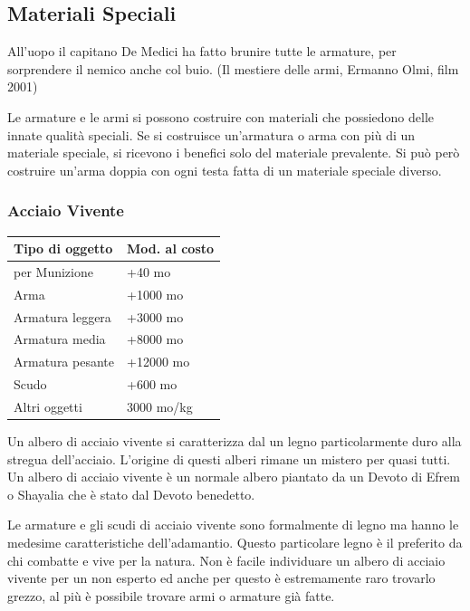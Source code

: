 \pagebreak

\subsection{Materiali Speciali}

\begin{enfasi}{
All'uopo il capitano De Medici ha fatto brunire tutte le armature, per sorprendere il nemico anche col buio. (Il mestiere delle armi, Ermanno Olmi, film 2001)}\end{enfasi}

\begin{multicols}{2}

Le armature e le armi si possono costruire con materiali che possiedono delle innate qualità speciali. Se si costruisce un'armatura o arma con più di un materiale speciale, si ricevono i benefici solo del materiale prevalente. Si può però costruire un'arma doppia con ogni testa fatta di un materiale speciale diverso.

\subsubsection{Acciaio Vivente}

\label{acciaio-vivente}

\noindent\begin{tabularx}{\linewidth}{Xl}
	\toprule
\rowcolor{gray!20}\textbf{Tipo di oggetto} & \textbf{Mod. al costo}\\
\toprule
per Munizione & +40 mo \\
\rowcolor{gray!20}Arma & +1000 mo\\
Armatura leggera & +3000 mo\\
\rowcolor{gray!20}Armatura media & +8000 mo\\
Armatura pesante & +12000 mo\\
\rowcolor{gray!20}Scudo & +600 mo\\
Altri oggetti & 3000 mo/kg
\end{tabularx}

\medskip
Un albero di acciaio vivente si caratterizza dal un legno particolarmente duro alla stregua dell'acciaio. L'origine di questi alberi rimane un mistero per quasi tutti. Un albero di acciaio vivente è un normale albero piantato da un Devoto di Efrem o Shayalia che è stato dal Devoto benedetto.

Le armature e gli scudi di acciaio vivente sono formalmente di legno ma hanno le medesime caratteristiche dell'adamantio. Questo particolare legno è il preferito da chi combatte e vive per la natura. Non è facile individuare un albero di acciaio vivente per un non esperto ed anche per questo è estremamente raro trovarlo grezzo, al più è possibile trovare armi o armature già fatte.


\end{multicols}
